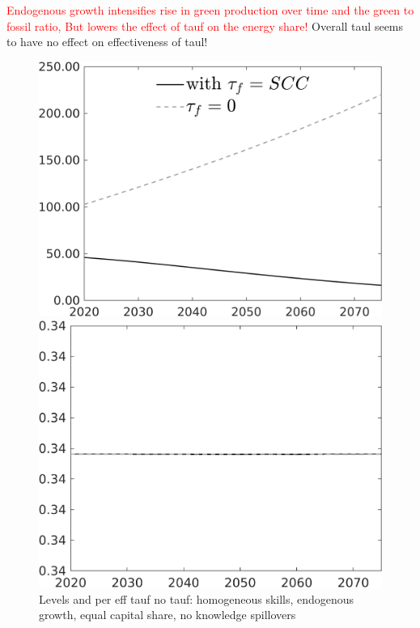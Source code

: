 \documentclass[12pt]{article}
\newcommand{\tr}[1]{\textcolor{red}{#1}}
\begin{document}
\tr{Endogenous growth intensifies rise in green production over time and the green to fossil ratio, But lowers the effect of tauf on the energy share!}
Overall taul seems to have no effect on effectiveness of taul! 

\begin{figure}[h!!]
	\centering
	\caption{Levels and per eff tauf no tauf: homogeneous skills, endogenous growth, equal capital share, no knowledge spillovers}\label{fig:Leveltauf_nsk1_xgr0_equalcapShare_noknow_withtaul}
	\begin{minipage}[]{0.32\textwidth}
		\includegraphics[width=1\textwidth]{../../codding_model/own_basedOnFried/optimalPol_010922_revision/figures/all_13Sept22/LevTaufNoTauf_TaulCalib_Equlab_regime0_Emnet_spillover0_nsk1_xgr0_knspil1_sep1_LFlimit0_emsbase0_countec0_GovRev0_etaa0.79_lgd1.png}
	\end{minipage}	
	\begin{minipage}[]{0.32\textwidth}
		\includegraphics[width=1\textwidth]{../../codding_model/own_basedOnFried/optimalPol_010922_revision/figures/all_13Sept22/LevTaufNoTauf_TaulCalib_Equlab_regime0_hh_spillover0_nsk1_xgr0_knspil1_sep1_LFlimit0_emsbase0_countec0_GovRev0_etaa0.79_lgd0.png}

\end{minipage}
\end{figure}
\end{document}

